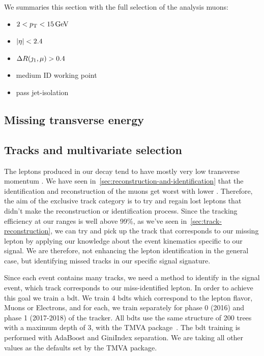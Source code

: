 We summaries this section with the full selection of the analysis muons:
\begin{itemize}[noitemsep]
\item $2<p_{\mathrm{T}}<15\,\text{Ge\hspace{-.08em}V}$
\item $\lvert \eta \rvert < 2.4$
\item $\Delta R(\jmath_1,\mu)>0.4$
\item medium ID working point
\item pass jet-isolation
\end{itemize}



\subsection{Missing transverse energy}
\label{subsec:met}


\clearpage
\subsection{Tracks and multivariate selection }

The leptons \ellell produced in our decay \neuttdecay tend to have mostly very low transverse momentum \pt. We have seen in~\ref{sec:reconstruction-and-identification} that the identification and reconstruction of the muons get worst with lower \pt. Therefore, the aim of the exclusive track category is to try and regain lost leptons that didn't make the reconstruction or identification process. Since the tracking efficiency at our \pt ranges is well above 99\%, as we've seen in~\ref{sec:track-reconstruction}, we can try and pick up the track that corresponds to our missing lepton by applying our knowledge about the event kinematics specific to our signal. We are therefore, not enhancing the lepton identification in the general case, but identifying missed tracks in our specific signal signature.

Since each event contains many tracks, we need a method to identify in the signal event, which track corresponds to our miss-identified lepton. In order to achieve this goal we train a \gls{bdt}. We train 4 \glspl{bdt} which correspond to the lepton flavor, Muons or Electrons, and for each, we train separately for phase 0 (2016) and phase 1 (2017-2018) of the tracker. All \glspl{bdt} use the same structure of 200 trees with a maximum depth of 3, with the TMVA package~\cite{tmva}. The \gls{bdt} training is performed with AdaBoost and GiniIndex separation. We are taking all other values as the defaults set by the TMVA package.

